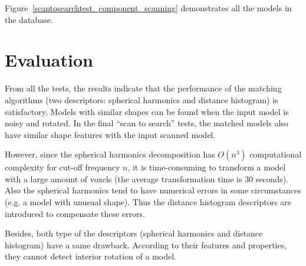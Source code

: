 Figure~\ref{scantosearchtest_component_scanning} demonstrates  all the models in the database. 

\section{Evaluation}

From all the tests, the results indicate that the performance of the matching algorithms (two descriptors: spherical harmonics and distance histogram) is satisfactory. Models with similar shapes can be found when the input model is noisy and rotated. In the final ``scan to search'' tests, the matched models also have similar shape features with the input scanned model. 

However, since the spherical harmonics decomposition has $O(n^3)$ computational complexity for cut-off frequency $n$, it is time-consuming to transform a model with a large amount of voxels (the average transformation time is 30 seconds). Also the spherical harmonics tend to have numerical errors in some circumstances (e.g. a model with unusual shape). Thus the distance histogram descriptors are introduced to compensate these errors. 

Besides, both type of the descriptors (spherical harmonics and distance histogram) have a same drawback. According to their features and properties, they cannot detect interior rotation of a model. 

